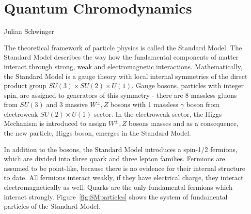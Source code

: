 \chapter{Quantum Chromodynamics}
\label{ch:qcd}

{Julian Schwinger}

The theoretical framework of particle physics is called the Standard Model. The
Standard Model describes the way how the fundamental components of matter
interact through strong, weak and electromagnetic interactions.
Mathematically, the
Standard Model is a gauge theory with local internal symmetries of
the direct product group $SU(3) \times SU(2) \times U(1)$. 
Gauge bosons, particles with integer spin, are assigned to generators of this
symmetry - there are 8 massless gluons from $SU(3)$ and 3 massive $W^\pm, Z$
bosons with 1 massless $\gamma$ boson from electroweak $SU(2) \times U(1)$
sector. 
In the electroweak sector, the Higgs Mechanism is introduced to assign $W^\pm, Z$
bosons masses and as a consequence, the new particle, Higgs boson, emerges in the
Standard Model. 

In addition to the bosons, the Standard Model introduces a spin-1/2 fermions,
which are divided into three quark and three lepton families. 
Fermions are assumed to be point-like, because there is no evidence for their
internal structure to date.
All fermions interact weakly, if they have electrical charge, they interact
electromagnetically as well. Quarks are the only fundamental fermions which
interact strongly. 
Figure~\ref{fig:SMparticles} shows the system of fundamental particles of the
Standard Model.

